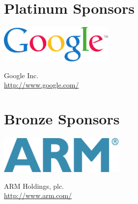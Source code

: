 \documentclass[a4paper,UKenglish]{oasicsmaster}
\begin{document}
\bigskip
\section*{Platinum Sponsors}
\bigskip

\noindent
\begin{minipage}{0.6\textwidth}
  \begin{center}
  \includegraphics[height=5em]{google}
  \end{center}
\end{minipage}
\begin{minipage}{0.39\textwidth}
  Google Inc.\\
  \url{http://www.google.com/}
\end{minipage}

\bigskip
\section*{Bronze Sponsors}
\bigskip

\noindent
\begin{minipage}{0.6\textwidth}
  \begin{center}
  \includegraphics[height=5em]{arm}
  \end{center}
\end{minipage}
\begin{minipage}{0.39\textwidth}
ARM Holdings, plc.\\
\url{http://www.arm.com/}
\end{minipage}

% 
% 
\end{document}
